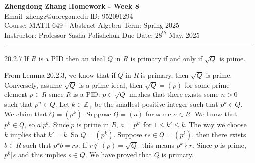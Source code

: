 \documentclass[letterpaper, 12pt]{article}
\begin{document}
\noindent
\large\textbf{Zhengdong Zhang} \hfill \textbf{Homework - Week 8} \\
Email: zhengz@uoregon.edu \hfill ID: 952091294 \\
\normalsize Course: MATH 649 - Abstract Algebra \hfill Term: Spring 2025 \\
Instructor: Professor Sasha Polishchuk \hfill Due Date: $28^{th}$ May, 2025 \\
\noindent\rule{7in}{2.8pt}
\begin{problem}{20.2.7}
If \(R\) is a PID then an ideal \(Q\) in \(R\) is primary if and only if \(\sqrt{Q}\) is prime. 
\end{problem}
\begin{solution}
From Lemma 20.2.3, we know that if \(Q\) in \(R\) is primary, then \(\sqrt{Q}\) is prime. Conversely, assume \(\sqrt{Q}\) is a prime ideal, then \(\sqrt{Q}=(p)\) for some prime element \(p\in R\) since \(R\) is a PID. \(p\in \sqrt{Q}\) implies that there exists some \(n>0\) such that \(p^n\in Q\). Let \(k\in \mathbb{Z}_+\) be the smallest positive integer such that \(p^k\in Q\). We claim that \(Q=(p^k)\). Suppose \(Q=(a)\) for some \(a\in R\). We know that \(p^k\in Q\), so \(a|p^k\). Since \(p\) is prime in \(R\), \(a=p^{k'}\) for \(1\leq k'\leq k\). The way we choose \(k\) implies that \(k'=k\). So \(Q=(p^k)\). Suppose \(rs\in Q=(p^k)\), then there exists \(b\in R\) such that \(p^k b=rs\). If \(r\notin (p)=\sqrt{Q}\), this means \(p^k\nmid r\). Since \(p\) is prime, \(p^k|s\) and this implies \(s\in Q\). We have proved that \(Q\) is primary. 
\end{solution}
\end{document}
